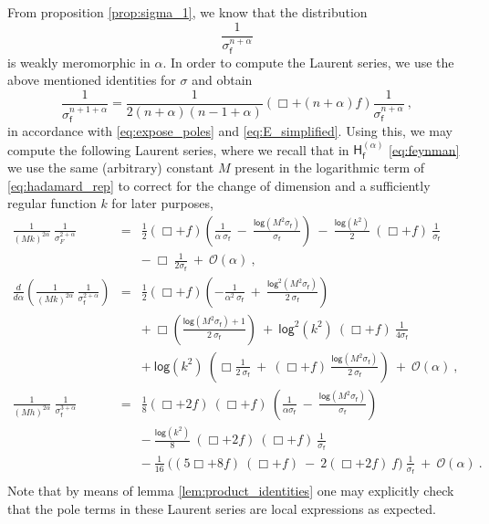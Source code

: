 \documentclass[11pt]{book}
\renewcommand{\log}{\mathsf{log}}
\newcommand{\Ocal}{\mathcal{O}}
\newcommand{\Hsf}{\mathsf{H}}
\newcommand{\fsf}{\mathsf{f}}
\theoremstyle{break}
\begin{document}
From proposition \ref{prop:sigma_1}, we know that the distribution
%
\begin{equation*}
\frac{1}{\sigma^{n+\alpha}_\fsf} 
\end{equation*}
%
is weakly meromorphic in $\alpha$. In order to compute the Laurent series, we use the above mentioned identities for $\sigma$ and obtain
%
\begin{equation*}
\frac{1}{\sigma^{n+1+\alpha}_\fsf} = \frac{1}{2(n+\alpha)(n-1+\alpha)} \left(\Box+(n+\alpha)f\right) \frac{1}{\sigma^{n+\alpha}_\fsf} \ ,
\end{equation*}
%
in accordance with \eqref{eq:expose_poles} and \eqref{eq:E_simplified}. Using this, we may compute the following Laurent series, where we recall that in $\Hsf^{(\alpha)}_\fsf$ \eqref{eq:feynman} we use the same (arbitrary) constant $M$ present in the logarithmic term  of \eqref{eq:hadamard_rep} to correct for the change of dimension and a sufficiently regular function $k$ for later purposes,
%
\begin{eqnarray}
\frac{1}{(Mk)^{2\alpha}} \ \frac{1}{\sigma^{2+\alpha}_F} &=& \frac12 \left(\Box+f\right) \left( \frac{1}{\alpha \ \sigma_\fsf} \ - \ \frac{\log\left(M^2 \sigma_\fsf\right)}{\sigma_\fsf}\right) \ - \ \frac{\log(k^2)}{2} \ \left(\Box+f\right) \ \frac{1}{\sigma_\fsf} \nonumber \\
&& - \ \Box \ \frac{1}{2\sigma_\fsf} \ + \ \Ocal(\alpha) \ , \nonumber \\
%
%
\frac{d}{d\alpha} \left( \frac{1}{(Mk)^{2\alpha}} \ \frac{1}{\sigma^{2+\alpha}_\fsf} \right) &=& \frac12 \left(\Box+f\right) \left(-\frac{1}{\alpha^2 \ \sigma_\fsf} \ + \ \frac{\log^2\left(M^2 \sigma_\fsf\right)}{2 \ \sigma_\fsf}\right)  \nonumber \\
&& + \ \Box\left(\frac{\log\left(M^2 \sigma_\fsf\right)+1}{2 \ \sigma_\fsf}\right) \ + \ \log^2(k^2) \ \left(\Box+f\right) \ \frac{1}{4\sigma_\fsf} \nonumber \\
&& + \ \log(k^2) \ \left(\Box\frac{1}{2 \ \sigma_\fsf} \ + \ \left(\Box+f\right) \ \frac{\log\left(M^2 \sigma_\fsf\right)}{2 \ \sigma_\fsf}\right) \ + \ \Ocal(\alpha) \ , \nonumber \\
%
%
\frac{1}{(M h)^{2\alpha}} \ \frac{1}{\sigma^{3+\alpha}_\fsf} &=& \frac18 \left(\Box+2f\right) \ \left(\Box+f\right) \ \left(\frac{1}{\alpha\sigma_\fsf} \ - \ \frac{\log \left(M^2 \sigma_\fsf\right)}{\sigma_\fsf}\right) \nonumber \\
&& - \ \frac{\log(k^2)}{8} \ (\Box+2f) \ (\Box+f) \ \frac{1}{\sigma_\fsf} \nonumber \\
&& - \ \frac{1}{16} \ \bigg( (5\Box+8f) \ (\Box+f) \ - \ 2 (\Box+2f) \ f \bigg) \ \frac{1}{\sigma_\fsf} \ + \ \Ocal(\alpha) \ . \nonumber \\
\label{eq:general_expansion}
\end{eqnarray}
%
Note that by means of lemma \ref{lem:product_identities} one may explicitly check that the pole terms in these Laurent series are local expressions as expected.
\end{document}
